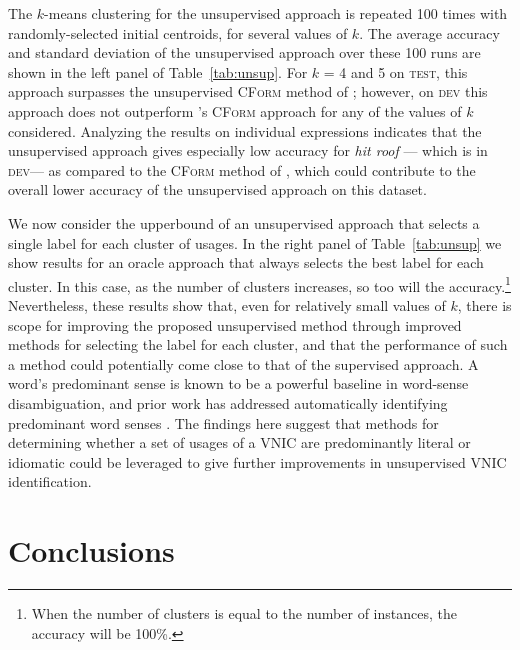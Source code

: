 \documentclass[11pt]{article}
\newcommand{\posciteauthor}[1]{\citeauthor{#1}'s}
\newcommand{\tabref}[1]{Table~\ref{#1}}
\newcommand{\cform}{\textsc{CForm}\xspace}
\newcommand{\VNIC}{VNIC\xspace}
\newcommand{\dev}{\textsc{dev}\xspace}
\newcommand{\test}{\textsc{test}\xspace}
\begin{document}
The $k$-means clustering for the unsupervised approach is repeated 100
times with randomly-selected initial centroids, for several values of
$k$.  The average accuracy and standard deviation of the unsupervised
approach over these 100 runs are shown in the left panel of
\tabref{tab:unsup}.
For $k$ = 4 and 5 on \test, this approach surpasses the unsupervised
\cform method of \cite{Fazly2009}; however, on \dev this approach does
not outperform \posciteauthor{Fazly2009} \cform approach for any of
the values of $k$ considered. Analyzing the results on individual
expressions indicates that the unsupervised approach gives especially
low accuracy for \emph{hit roof} --- which is in \dev --- as compared
to the \cform method of \citeauthor{Fazly2009}, which could contribute
to the overall lower accuracy of the unsupervised approach on this
dataset.



We now consider the upperbound of an unsupervised approach that
selects a single label for each cluster of usages. In the right panel
of \tabref{tab:unsup} we show results for an oracle approach that
always selects the best label for each cluster. In this case, as the
number of clusters increases, so too will the accuracy.\footnote{When
  the number of clusters is equal to the number of instances, the
  accuracy will be 100\%.} Nevertheless, these results show that, even
for relatively small values of $k$, there is scope for improving the
proposed unsupervised method through improved methods for selecting
the label for each cluster, and that the performance of such a method
could potentially come close to that of the supervised approach. A
word's predominant sense is known to be a powerful baseline in
word-sense disambiguation, and prior work has addressed automatically
identifying predominant word senses \citep{McCarthy2007,
  Lau+:2014}. The findings here suggest that methods for determining
whether a set of usages of a \VNIC are predominantly literal or
idiomatic could be leveraged to give further improvements in
unsupervised \VNIC identification.


\section{Conclusions}
\end{document}
